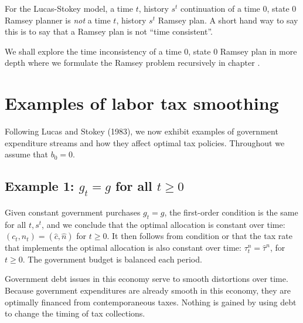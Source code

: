   For the Lucas-Stokey model, a time $t$, history $s^t$ continuation  of a time $0$, state $0$ Ramsey planner is
{\it not\/} a time $t$, history $s^t$ Ramsey plan.
A short hand way to say this is to say that
a Ramsey plan is not ``time consistent''.
%

\medskip

\noindent We shall explore the time inconsistency  of a  time  $0$, state $0$ Ramsey plan in more depth  %
 where we formulate
the Ramsey problem recursively in chapter .



\section{Examples of labor tax smoothing}\label{sec:labor_tax_smoothing}
Following Lucas and Stokey (1983),
we now exhibit examples of government expenditure streams and how
they affect optimal tax policies. %
Throughout we assume that
$b_0=0$.


\subsection{Example 1: $g_t=g$ for all $t\geq0$}
\label{sec:LucasStokey_ex1}%
Given  constant  government purchases $g_t=g$, the first-order condition
 is the same for all $t, s^t$, and we conclude that the
optimal allocation is constant over time: $(c_t,n_t)=(\hat c, \hat n)$
for $t\geq 0$. It then follows from condition  or
 that the tax rate
that  implements the optimal allocation is also constant over
time: $\tau^n_t=\hat \tau^n$, for $t\geq 0$.
The government budget is balanced  each period.

Government debt issues in this economy  serve to smooth
distortions over time. Because government expenditures are already smooth
in this economy, they are optimally financed from contemporaneous
taxes. Nothing is gained by using debt to change the timing of tax
collections.



